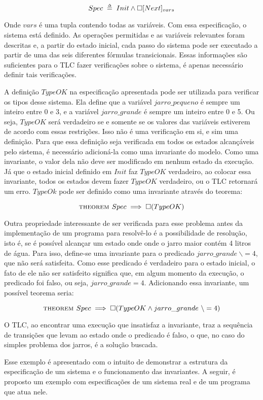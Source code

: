 \[Spec \;\mathrel{\smash {{\stackrel{\scriptscriptstyle\Delta}{=}}}}\; Init \land \square [Next]_{vars}\]

Onde $vars$ é uma tupla contendo todas as variáveis. Com essa especificação, o sistema está definido. As operações permitidas e as variáveis relevantes foram descritas e, a partir do estado inicial, cada passo do sistema pode ser executado a partir de uma das seis diferentes fórmulas transicionais. Essas informações são suficientes para o TLC fazer verificações sobre o sistema, é apenas necessário definir tais verificações.

A definição $TypeOK$ na especificação apresentada pode ser utilizada para verificar os tipos desse sistema. Ela define que a variável $jarro\_pequeno$ é sempre um inteiro entre 0 e 3, e a variável $jarro\_grande$ é sempre um inteiro entre 0 e 5. Ou seja, $TypeOK$ será verdadeiro se e somente se os valores das variáveis estiverem de acordo com essas restrições. Isso não é uma verificação em si, e sim uma definição. Para que essa definição seja verificada em todos os estados alcançáveis pelo sistema, é necessário adicioná-la como uma invariante do modelo. Como uma invariante, o valor dela não deve ser modificado em nenhum estado da execução. Já que o estado inicial definido em $Init$ faz $TypeOK$ verdadeiro, ao colocar essa invariante, todos os estados devem fazer $TypeOK$ verdadeiro, ou o TLC retornará um erro. $TypeOk$ pode ser definido como uma invariante através do teorema:

\[\textsc{theorem } Spec \implies \square (TypeOK)\]

Outra propriedade interessante de ser verificada para esse problema antes da implementação de um programa para resolvê-lo é a possibilidade de resolução, isto é, se é possível alcançar um estado onde onde o jarro maior contém 4 litros de água. Para isso, define-se uma invariante para o predicado $jarro\_grande\ \backslash= 4$, que não será satisfeita. Como esse predicado é verdadeiro para o estado inicial, o fato de ele não ser satisfeito significa que, em algum momento da execução, o predicado foi falso, ou seja, $jarro\_grande = 4$. Adicionando essa invariante, um possível teorema seria:

\[\textsc{theorem } Spec \implies \square (TypeOK \land jarro\_grande\ \backslash= 4)\]

O TLC, ao encontrar uma execução que insatisfaz a invariante, traz a sequência de transições que levam ao estado onde o predicado é falso, o que, no caso do simples problema dos jarros, é a solução buscada.

Esse exemplo é apresentado com o intuito de demonstrar a estrutura da especificação de um sistema e o funcionamento das invariantes. A seguir, é proposto um exemplo com especificações de um sistema real e de um programa que atua nele.

